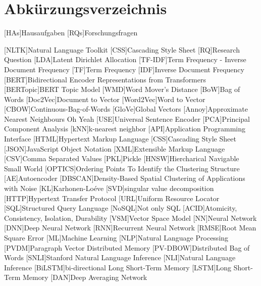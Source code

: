 \chapter*{Abkürzungsverzeichnis}


[HAs]{Hausaufgaben}
[RQs]{Forschungsfragen}

\begin{acronym}[XXXXXX]
    [NLTK]{Natural Language Toolkit}
    [CSS]{Cascading Style Sheet}
    [RQ]{Research Question}
    [LDA]{Latent Dirichlet Allocation}
    [TF-IDF]{Term Frequency - Inverse Document Frequency}
    [TF]{Term Frequency}
    [IDF]{Inverse Document Frequency}
    [BERT]{Bidirectional Encoder Representations from Transformers}
    [BERTopic]{BERT Topic Model}
    [WMD]{Word Mover's Distance}
    [BoW]{Bag of Words}
    [Doc2Vec]{Document to Vector}
    [Word2Vec]{Word to Vector}
    [CBOW]{Continuous-Bag-of-Words}
    [GloVe]{Global Vectors}
    [Annoy]{Approximate Nearest Neighbours Oh Yeah}
    [USE]{Universal Sentence Encoder}
    [PCA]{Principal Component Analysis}
    [kNN]{k-nearest neighbor}
    [API]{Application Programming Interface}
    [HTML]{Hypertext Markup Language}
    [CSS]{Cascading Style Sheet}
    [JSON]{JavaScript Object Notation}
    [XML]{Extensible Markup Language}
    [CSV]{Comma Separated Values}
    [PKL]{Pickle}
    [HNSW]{Hiercharical Navigable Small World}
    [OPTICS]{Ordering Points To Identify the Clustering Structure}
    [AE]{Autoencoder}
    [DBSCAN]{Density-Based Spatial Clustering of Applications with Noise}
    [KL]{Karhonen-Loéve}
    [SVD]{singular value decomposition}
    [HTTP]{Hypertext Transfer Protocol}
    [URL]{Uniform Resource Locator}
    [SQL]{Structured Query Language}
    [NoSQL]{Not only SQL}
    [ACID]{Atomicity, Consistency, Isolation, Durability}
    [VSM]{Vector Space Model}
    [NN]{Neural Network}
    [DNN]{Deep Neural Network}
    [RNN]{Recurrent Neural Network}
    [RMSE]{Root Mean Square Error}
    [ML]{Machine Learning}
    [NLP]{Natural Language Processing}
    [PVDM]{Paragraph Vector Distributed Memory}
    [PV-DBOW]{Distributed Bag of Words}
    [SNLI]{Stanford Natural Language Inference}
    [NLI]{Natural Language Inference}
    [BiLSTM]{bi-directional Long Short-Term Memory}
    [LSTM]{Long Short-Term Memory}
    [DAN]{Deep Averaging Network}



\end{acronym}
